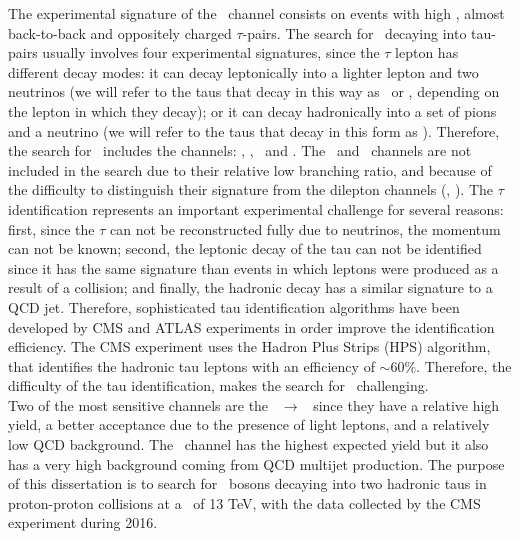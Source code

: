 \noindent The experimental signature of the \Zprimetotautau~channel consists on events with high \pt, almost
back-to-back and oppositely charged $\tau$-pairs. The search for \Zprime~decaying into tau-pairs 
usually involves four experimental signatures, since the $\tau$ lepton has different decay modes: it 
can decay leptonically into a lighter lepton and two neutrinos (we will refer to the taus that decay in 
this way as \taue~or \taumu, depending on the lepton in which they decay); 
or it can decay hadronically into a set of pions and a neutrino (we will refer to the taus that decay in this form
as \tauh). Therefore, the search for \Zprimetotautau~includes 
the channels: \taue\tauh, \taumu\tauh, \taue\taumu~and \tauh\tauh. The \taue\taue~and \taumu\taumu~channels
are not included in the search due to their relative low branching ratio, and because of the difficulty to
distinguish their signature from the dilepton channels (\Zprimetomumu, \Zprimetoee). The $\tau$ 
identification represents an important experimental challenge for several reasons: first, since 
the $\tau$ can not be reconstructed fully due to neutrinos, the momentum can not be known; second, the leptonic decay of 
the tau can not be identified since it has the same signature than events in which leptons were produced as a result of 
a collision; and finally, the hadronic decay has a similar signature to a QCD jet. Therefore, sophisticated tau 
identification algorithms have been developed by CMS and ATLAS experiments in order improve the identification 
efficiency. The CMS experiment uses the Hadron Plus Strips (HPS) algorithm, that 
identifies the hadronic tau leptons with an efficiency of $\sim$60$\%$. Therefore, the difficulty of the tau 
identification, makes the search for \Zprimetotautau~challenging. \\

\noindent Two of the most sensitive channels are the \Zprime~$\rightarrow$ \tauell\tauh~since they have 
a relative high yield, a better acceptance due to the presence of light leptons, and a relatively
low QCD background. The \Zprimetotauh~channel has the highest 
expected yield but it also has a very high background coming 
from QCD multijet production. The purpose of this dissertation is to search for \Zprime~bosons decaying into two hadronic taus 
in proton-proton collisions at a \centermassenergy~of 13 TeV, with the data collected by the 
CMS  experiment during 2016. \\


